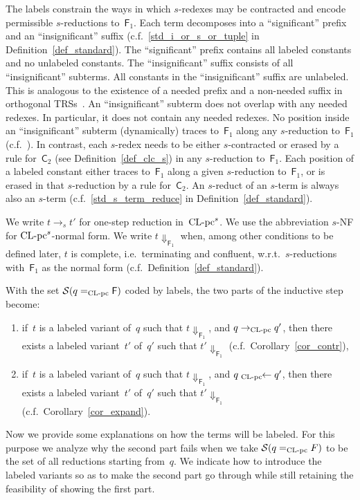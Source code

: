 \documentclass[a4paper,UKenglish]{lipics-v2016}
\newcommand{\Cs}{\mathsf{C}}
\newcommand{\Fs}{\mathsf{F}}
\newcommand{\from}{\ensuremath{\leftarrow}}
\newcommand{\Da}{\ensuremath{\Downarrow}}
\newcommand{\leftidx}[3]{{\;\vphantom{#2}}#1\!\!#2#3}
\newcommand{\Sc}{\ensuremath{{\mathcal S}}}
\newcommand{\sCLCz}{\ensuremath{\text{\rm CL-pc}}}
\newcommand{\CLCs}{{\mbox{${\text{\rm CL-pc}^s}$}}}
\begin{document}
The labels constrain the ways in which $s$-redexes may be contracted
and encode permissible $s$-reductions to~$\Fs_1$. Each term decomposes
into a ``significant'' prefix and an ``insignificant'' suffix
(c.f.~\ref{std_i_or_s_or_tuple} in Definition~\ref{def_standard}). The
``significant'' prefix contains all labeled constants and no unlabeled
constants. The ``insignificant'' suffix consists of all
``insignificant'' subterms. All constants in the ``insignificant''
suffix are unlabeled. This is analogous to the existence of a needed
prefix and a non-needed suffix in orthogonal
TRSs~\cite[Section~9.2.2]{Terese2003}. An ``insignificant'' subterm
does not overlap with any needed redexes. In particular, it does not
contain any needed redexes. No position inside an ``insignificant''
subterm (dynamically) traces to~$\Fs_1$ along any $s$-reduction
to~$\Fs_1$ (c.f.~\cite[Definition~8.6.7]{Terese2003}). In contrast,
each $s$-redex needs to be either $s$-contracted or erased by a rule
for~$\Cs_2$ (see Definition~\ref{def_clc_s}) in any $s$-reduction
to~$\Fs_1$. Each position of a labeled constant either traces
to~$\Fs_1$ along a given $s$-reduction to~$\Fs_1$, or is erased in
that $s$-reduction by a rule for~$\Cs_2$. An $s$-reduct of an $s$-term
is always also an $s$-term (c.f.~\ref{std_s_term_reduce} in
Definition~\ref{def_standard}).

We write $t \to_s t'$ for one-step reduction in~$\CLCs$. We use the
abbreviation $s$-NF for $\CLCs$-normal form. We write $t \Da_{\Fs_1}$
when, among other conditions to be defined later, $t$ is complete,
i.e.~terminating and confluent, w.r.t.~$s$-reductions with~$\Fs_1$ as
the normal form (c.f.~Definition~\ref{def_standard}).

With the set $\Sc(q =_{\sCLCz} \Fs)$ coded by labels, the two parts of
the inductive step become:
\begin{enumerate}
\item if~$t$ is a labeled variant of~$q$ such that $t \Da_{\Fs_1}$,
  and $q \to_{\sCLCz} q'$, then there exists a labeled variant~$t'$
  of~$q'$ such that $t' \Da_{\Fs_1}$ (c.f.~Corollary~\ref{cor_contr}),
\item if~$t$ is a labeled variant of~$q$ such that $t \Da_{\Fs_1}$,
  and $q \leftidx{{}_{\sCLCz}}{\from} q'$, then there exists a labeled
  variant~$t'$ of~$q'$ such that $t' \Da_{\Fs_1}$
  (c.f.~Corollary~\ref{cor_expand}).
\end{enumerate}

Now we provide some explanations on how the terms will be labeled. For
this purpose we analyze why the second part fails when we take
$\Sc(q =_{\sCLCz} F)$ to be the set of all reductions starting
from~$q$. We indicate how to introduce the labeled variants so as to
make the second part go through while still retaining the feasibility
of showing the first part.
\end{document}
